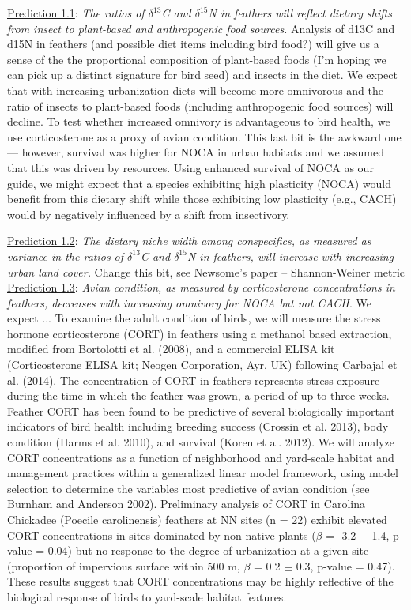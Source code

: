 \documentclass[12pt]{article}
\begin{document}
\noindent \underline{Prediction 1.1}: \textit{The ratios of $\delta^{13}$C and $\delta^{15}$N in feathers will reflect dietary shifts from insect to plant-based and anthropogenic food sources.}  Analysis of d13C and d15N in feathers (and possible diet items including bird food?) will give us a sense of the the proportional composition of plant-based foods (I’m hoping we can pick up a distinct signature for bird seed) and insects in the diet. We expect that with increasing urbanization diets will become more omnivorous and the ratio of insects to plant-based foods (including anthropogenic food sources) will decline. To test whether increased omnivory is advantageous to bird health, we use corticosterone as a proxy of avian condition. This last bit is the awkward one — however, survival was higher for NOCA in urban habitats and we assumed that this was driven by resources. Using enhanced survival of NOCA as our guide, we might expect that a species exhibiting high plasticity (NOCA) would benefit from this dietary shift while those exhibiting low plasticity (e.g., CACH) would by negatively influenced by a shift from insectivory.\par


\noindent \underline{Prediction 1.2}: \textit{ The dietary niche width among conspecifics, as measured as variance in the ratios of $\delta^{13}$C and $\delta^{15}$N in feathers,  will increase with increasing urban land cover.} Change this bit, 
see Newsome's paper -- Shannon-Weiner metric \\



\noindent \underline{Prediction 1.3}: \textit{Avian condition, as measured by corticosterone concentrations in feathers, decreases with increasing omnivory for NOCA but not CACH.} We expect ... To examine the adult condition of birds, we will 
measure the stress hormone corticosterone (CORT) in feathers using a methanol based extraction, modified from Bortolotti et al. (2008), and a commercial ELISA kit (Corticosterone ELISA kit; Neogen Corporation, Ayr, UK) following 
Carbajal et al. (2014). The concentration of CORT in feathers represents stress exposure during the time in which the feather was grown, a period of up to three weeks. Feather CORT has been found to be predictive of several biologically 
important indicators of bird health including breeding success (Crossin et al. 2013), body condition (Harms et al. 2010), and survival (Koren et al. 2012). We will analyze CORT concentrations as a function of neighborhood and yard-scale 
habitat and management practices within a generalized linear model framework, using model selection to determine the variables most predictive of avian condition (see Burnham and Anderson 2002). Preliminary analysis of CORT in Carolina 
Chickadee (Poecile carolinensis) feathers at NN sites (n = 22) exhibit elevated CORT concentrations in sites dominated by non-native plants ($\beta$ = -3.2 $\pm$ 1.4, p-value = 0.04) but no response to the degree of urbanization at a 
given site (proportion of impervious surface within 500 m, $\beta$ = 0.2 $\pm$ 0.3, p-value = 0.47). These results suggest that CORT concentrations may be highly reflective of the biological response of birds to yard-scale habitat 
features.\par
\end{document}

